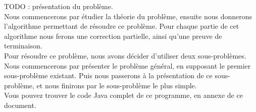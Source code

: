 TODO : présentation du problème. \\


Nous commencerons par étudier la théorie du problème, ensuite nous donnerons l'algorithme permettant de résoudre ce problème. Pour chaque partie de cet algorithme nous  ferons une correction partielle, ainsi qu'une preuve de terminaison. \\

Pour résoudre ce problème, nous avons décider d'utiliser deux sous-problèmes. Nous commencerons par présenter le problème général, en supposant le premier sous-problème existant. Puis nous passerons à la présentation de ce sous-problème, et nous finirons par le sous-problème le plus simple.  \\

Vous pouvez trouver le code Java complet de ce programme, en annexe de ce document. \\